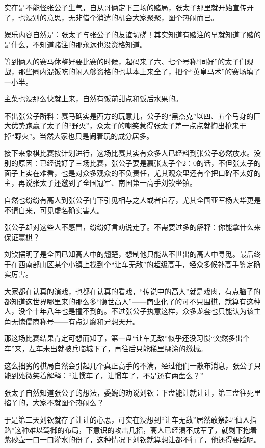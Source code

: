 实在是不能怪张公子生气，自从哥俩定下三场的赌局，张太子那里就开始宣传开了，也没别的意思，无非借个消遣的机会大家聚聚，图个热闹而已。

娱乐内容自然是：张太子与张公子的友谊切磋！其实知道有赌注的早就知道了赌的是什么，不知道赌注的那永远也没资格知道。

等到俩人的赛马休整好要比赛的时候，起码来了六、七个号称“同好”的太子们观战，那些圈内混饭吃的闲人够资格的也基本上来全了，把个“英皇马术”的赛场填了一小半。

主菜也没那么快就上来，自然有饭前甜点和饭后水果的。

不出张公子所料：赛马确实是西方的玩意儿，公子的“黑杰克”以四、五个马身的巨大优势跑赢了太子的“野火”，众太子的嘲笑惹得张太子差一点点就掏出枪来干掉“野火”。当然大家也只是闹着玩的成分居多。

接下来象棋比赛按计划进行，这场比赛其实有众多人已经料到张公子必然放水。没别的原因：已经说好了三场比赛，张公子要是赢张太子个2：0的话，不但张太子的面子上实在难看，也是对众多观众的不负责任，尤其观众里还有个把口碑不太好的主，再说张太子还邀到了全国冠军、南国第一高手刘钦坐镇。

自然也纷纷有高人到张公子门下引见相与之人或者自荐，尤其全国亚军杨大华更是不请自来，可见虚名确实害人。

张公子却对这些人不感冒，纷纷好言劝说走了。不需要过多的解释：你能拿什么来保证赢棋？

刘钦摆明了是全国已知高人中的翘楚，想制他只能从不世出的高人中寻觅。最后终于在西南部山区某个小镇上找到个“让车无敌”的超级高手，经众多候补高手鉴定确实厉害。

大家都在认真的演戏，也都在认真的看戏，“传说中的高人”就是戏肉，有点脑子的都知道这世界哪里来的那么多“隐世高人”——商业化了的可不只围棋，就算有这种人，没个十年八年也是撞不到的。不过张公子执意这样，众多龙套也只能认为该主角无愧儒商称号——有点迂腐和异想天开。

那这场比赛结果肯定可想而知了，第一盘“让车无敌”似乎还没习惯“突然多出个车”来，左车未出就被兵临城下了，再往后只能稀里糊涂的缴械。

这么拙劣的棋局自然会引起几个真正高手的不满，经过他们一散布消息，张公子只能到处微笑着解释：“让惯车了，让惯车了，不是还有两盘么？”

张太子自然知道张公子的想法，委婉的劝说刘钦：下盘能让就让让，第三盘往死里掐丫的，大家不就图个热闹么？

于是第二天刘钦就存了让让的心思，可实在没想到“让车无敌”居然敢祭起“仙人指路”这种难以驾御的布局，下意识的攻击几招，高人已经溃不成军了，就剩下抱着紫砂壶一口一口灌水的份了，这种情况下刘钦就算想让都不行了，他还得要脸呢。

